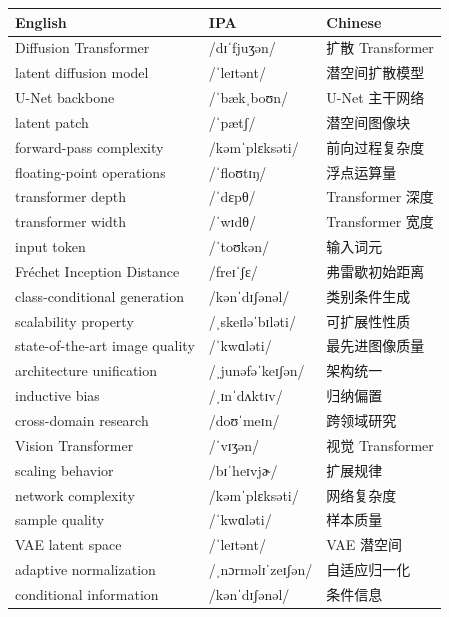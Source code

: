 \documentclass[UTF8,12pt,a4paper]{ctexart}
\providecommand{\zh}[1]{#1}
\begin{document}
\begin{tabular*}{\textwidth}{@{\extracolsep{\fill}}lll@{}}
\toprule
\textbf{English} & \textbf{IPA} & \textbf{Chinese} \\
\midrule
Diffusion Transformer & {\ipafont /dɪˈfjuʒən/} & \zh{扩散 Transformer} \\
latent diffusion model & {\ipafont /ˈleɪtənt/} & \zh{潜空间扩散模型} \\
U-Net backbone & {\ipafont /ˈbækˌboʊn/} & \zh{U-Net 主干网络} \\
latent patch & {\ipafont /ˈpætʃ/} & \zh{潜空间图像块} \\
forward-pass complexity & {\ipafont /kəmˈplɛksəti/} & \zh{前向过程复杂度} \\
floating-point operations & {\ipafont /ˈfloʊtɪŋ/} & \zh{浮点运算量} \\
transformer depth & {\ipafont /ˈdɛpθ/} & \zh{Transformer 深度} \\
transformer width & {\ipafont /ˈwɪdθ/} & \zh{Transformer 宽度} \\
input token & {\ipafont /ˈtoʊkən/} & \zh{输入词元} \\
Fréchet Inception Distance & {\ipafont /freɪˈʃɛ/} & \zh{弗雷歇初始距离} \\
class-conditional generation & {\ipafont /kənˈdɪʃənəl/} & \zh{类别条件生成} \\
scalability property & {\ipafont /ˌskeɪləˈbɪləti/} & \zh{可扩展性性质} \\
state-of-the-art image quality & {\ipafont /ˈkwɑləti/} & \zh{最先进图像质量} \\
architecture unification & {\ipafont /ˌjunəfəˈkeɪʃən/} & \zh{架构统一} \\
inductive bias & {\ipafont /ˌɪnˈdʌktɪv/} & \zh{归纳偏置} \\
cross-domain research & {\ipafont /doʊˈmeɪn/} & \zh{跨领域研究} \\
Vision Transformer & {\ipafont /ˈvɪʒən/} & \zh{视觉 Transformer} \\
scaling behavior & {\ipafont /bɪˈheɪvjɚ/} & \zh{扩展规律} \\
network complexity & {\ipafont /kəmˈplɛksəti/} & \zh{网络复杂度} \\
sample quality & {\ipafont /ˈkwɑləti/} & \zh{样本质量} \\
VAE latent space & {\ipafont /ˈleɪtənt/} & \zh{VAE 潜空间} \\
adaptive normalization & {\ipafont /ˌnɔrməlɪˈzeɪʃən/} & \zh{自适应归一化} \\
conditional information & {\ipafont /kənˈdɪʃənəl/} & \zh{条件信息} \\

\end{tabular*}
\end{document}
